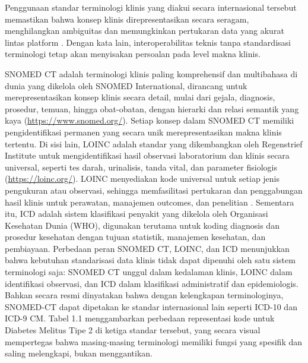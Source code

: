Penggunaan standar terminologi klinis yang diakui secara internasional tersebut memastikan bahwa konsep klinis direpresentasikan secara seragam, menghilangkan ambiguitas dan memungkinkan pertukaran data yang akurat lintas platform \citep{bidgood_snomed_1998}. Dengan kata lain, interoperabilitas teknis tanpa standardisasi terminologi tetap akan menyisakan persoalan pada level makna klinis.

SNOMED CT adalah terminologi klinis paling komprehensif dan multibahasa di dunia yang dikelola oleh SNOMED International, dirancang untuk merepresentasikan konsep klinis secara detail, mulai dari gejala, diagnosis, prosedur, temuan, hingga obat-obatan, dengan hierarki dan relasi semantik yang kaya (\url{https://www.snomed.org/}). Setiap konsep dalam SNOMED CT memiliki pengidentifikasi permanen yang secara unik merepresentasikan makna klinis tertentu. Di sisi lain, LOINC adalah standar yang dikembangkan oleh Regenstrief Institute untuk mengidentifikasi hasil observasi laboratorium dan klinis secara universal, seperti tes darah, urinalisis, tanda vital, dan parameter fisiologis (\url{https://loinc.org/}). LOINC menyediakan kode universal untuk setiap jenis pengukuran atau observasi, sehingga memfasilitasi pertukaran dan penggabungan hasil klinis untuk perawatan, manajemen outcomes, dan penelitian \citep{ayuningtyas_bringing_2025}. Sementara itu, ICD adalah sistem klasifikasi penyakit yang dikelola oleh Organisasi Kesehatan Dunia (WHO), digunakan terutama untuk koding diagnosis dan prosedur kesehatan dengan tujuan statistik, manajemen kesehatan, dan pembiayaan. Perbedaan peran SNOMED CT, LOINC, dan ICD menunjukkan bahwa kebutuhan standarisasi data klinis tidak dapat dipenuhi oleh satu sistem terminologi saja: SNOMED CT unggul dalam kedalaman klinis, LOINC dalam identifikasi observasi, dan ICD dalam klasifikasi administratif dan epidemiologis. Bahkan secara resmi dinyatakan bahwa dengan kelengkapan terminologinya, SNOMED-CT dapat dipetakan ke standar internasional lain seperti ICD-10 dan ICD-9 CM. Tabel 1.1 menggambarkan perbedaan representasi kode untuk Diabetes Melitus Tipe 2 di ketiga standar tersebut, yang secara visual mempertegas bahwa masing-masing terminologi memiliki fungsi yang spesifik dan saling melengkapi, bukan menggantikan.

